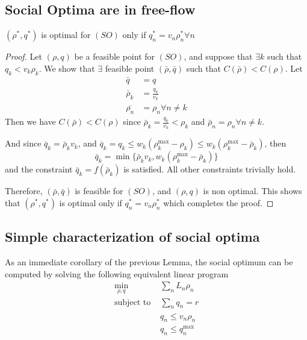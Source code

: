 \subsection{Social Optima are in free-flow}
\begin{lemma}
\label{lemma:relaxedTTT_is_ff}
$(\rho^*, q^*)$ is optimal for $(SO)$ only if $q^*_n = v_n \rho^*_n \forall n$
\end{lemma}


\begin{proof}
Let $( \rho,  q)$ be a feasible point for $(SO)$, and suppose that $\exists k$ such that $q_k < v_k \rho_k$. We show that $\exists$ feasible point $(\bar{ \rho}, \bar{ q})$ such that $C(\bar{ \rho}) < C( \rho)$.
Let
\begin{align*}
\bar{q} &= q\\
\bar{\rho}_k &= \frac{q_k}{v_k}\\
\bar{\rho_n} &= \rho_n \forall n \neq k
\end{align*}
Then we have $C(\bar{ \rho}) < C( \rho)$ since $\bar{\rho}_k = \frac{q_k}{v_k} < \rho_k$ and $\bar{\rho}_n = \rho_n \forall n \neq k$.

And since $\bar{q}_k = \bar{\rho}_k v_k$, and $\bar{q}_k = q_k \leq w_k(\rho_k^{\max} - \rho_k ) \leq w_k(\rho_k^{\max} - \bar{\rho}_k )$, then
\[
\bar{q}_k = \min \{ \bar{\rho}_k v_k,  w_k(\rho_k^{\max} - \bar{\rho}_k ) \}
\]
and the constraint $\bar{q}_k = f(\bar{\rho}_k)$ is satisfied. All other constraints trivially hold.

Therefore, $(\bar{ \rho}, \bar{ q})$ is feasible for $(SO)$, and $( \rho,  q)$ is non optimal. This shows that $( \rho^*,  q^*)$ is optimal only if $q^*_n = v_n \rho^*_n$ which completes the proof.
\end{proof}

\bigskip

\subsection{Simple characterization of social optima}
As an immediate corollary of the previous Lemma, the social optimum can be computed by solving the following equivalent linear program
\begin{align*}
\min_{\rho, q}  &\sum_n L_n \rho_n\\
\text{subject to } & 
\sum_n q_n = r\\
& q_n \leq v_n \rho_n\\
& q_n \leq q_n^{\max}
\end{align*}

